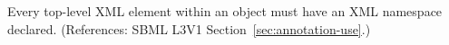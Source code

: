 Every top-level XML element within an \Annotation object must have an XML
namespace declared.  (References: SBML L3V1 Section~\ref{sec:annotation-use}.)
